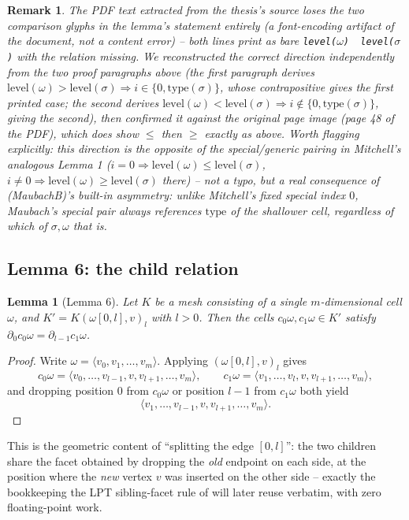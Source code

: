 \documentclass[11pt]{article}
\newtheorem*{lemthm}{Lemma}
\newtheorem*{remthm}{Remark}
\newcommand{\type}{\mathrm{type}}
\newcommand{\level}{\mathrm{level}}
\begin{document}
\begin{remthm}
The PDF text extracted from the thesis's source loses the two comparison
glyphs in the lemma's statement entirely (a font-encoding artifact of the
document, not a content error) -- both lines print as bare
\texttt{level($\omega$)\ \ level($\sigma$)} with the relation missing. We
reconstructed the correct direction independently from the two proof
paragraphs above (the first paragraph derives
$\level(\omega)>\level(\sigma)\Rightarrow i\in\{0,\type(\sigma)\}$, whose
contrapositive gives the \emph{first} printed case; the second derives
$\level(\omega)<\level(\sigma)\Rightarrow i\notin\{0,\type(\sigma)\}$,
giving the \emph{second}), then confirmed it against the original page
image (page 48 of the PDF), which does show $\le$ then $\ge$ exactly as
above. Worth flagging explicitly: this direction is the \emph{opposite} of
the special/generic pairing in Mitchell's analogous Lemma 1 ($i=0\Rightarrow
\level(\omega)\le\level(\sigma)$, $i\ne0\Rightarrow\level(\omega)\ge
\level(\sigma)$ there) -- not a typo, but a real consequence of
(MaubachB)'s built-in asymmetry: unlike Mitchell's fixed special index $0$,
Maubach's special pair always references $\type$ of the \emph{shallower}
cell, regardless of which of $\sigma,\omega$ that is.
\end{remthm}

\subsection{Lemma 6: the child relation}

\begin{lemthm}[Lemma 6]
Let $K$ be a mesh consisting of a single $m$-dimensional cell $\omega$, and
$K'=K(\omega[0,l],v)_l$ with $l>0$. Then the cells $c_0\omega,c_1\omega\in
K'$ satisfy $\partial_0 c_0\omega=\partial_{l-1}c_1\omega$.
\end{lemthm}

\begin{proof}
Write $\omega=\langle v_0,v_1,\dots,v_m\rangle$. Applying $(\omega[0,l],v)_l$
gives
\[
  c_0\omega=\langle v_0,\dots,v_{l-1},v,v_{l+1},\dots,v_m\rangle,\qquad
  c_1\omega=\langle v_1,\dots,v_l,v,v_{l+1},\dots,v_m\rangle,
\]
and dropping position $0$ from $c_0\omega$ or position $l-1$ from
$c_1\omega$ both yield
\[\langle v_1,\dots,v_{l-1},v,v_{l+1},\dots,v_m\rangle.\]
\end{proof}

This is the geometric content of ``splitting the edge $[0,l]$'': the two
children share the facet obtained by dropping the \emph{old} endpoint on
each side, at the position where the \emph{new} vertex $v$ was inserted on
the other side -- exactly the bookkeeping the LPT sibling-facet rule of
 will later reuse verbatim, with zero floating-point work.
\end{document}

